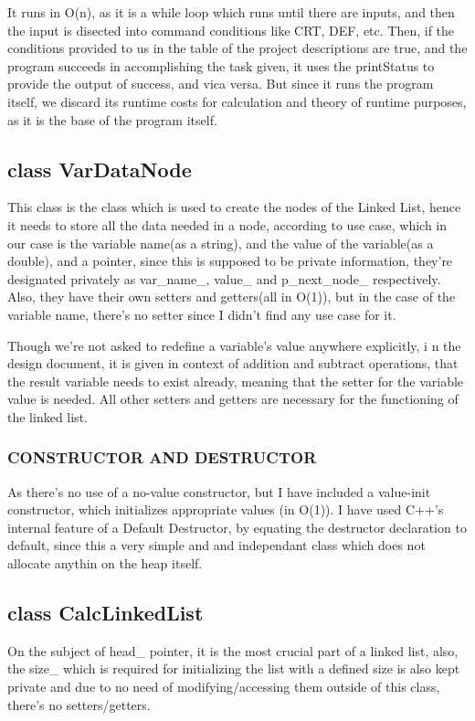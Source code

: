 \documentclass[a4paper]{article}
\begin{document}
    It runs in {\color{lightblue}O(n)}, as it is a while loop which runs until there are 
    inputs, and then the input is disected into command conditions like 
    CRT, DEF, etc. Then, if the conditions provided to us in the table of 
    the project descriptions are true, and the program succeeds in 
    accomplishing the task given, it uses the {\color{draculapurple}printStatus} 
    to provide the output of success, and vica versa. But since it runs the program itself, 
    we discard its runtime costs for calculation and theory of runtime purposes, 
    as it is the base of the program itself.
    \subsection{{\color{orange}class} {\color{draculapurple}VarDataNode}}
    This class is the class which is used to create the nodes of the Linked List, 
    hence it needs to store all the data needed in a node, according to use case, 
    which in our case is the variable name{\color{orange}(as a string)}, and the value of the 
    variable{\color{orange}(as a double)}, and a pointer, since this is supposed to be private information, 
    they're designated privately as var\_name\_, value\_ and p\_next\_node\_ respectively. 
    Also, they have their own setters and getters{\color{lightblue}(all in O(1))}, 
    but in the case of the variable name, there's no setter since I didn't find 
    any use case for it. 
    
    Though we're not asked to redefine a variable's value anywhere explicitly, i
    n the design document, it is given in context of addition and subtract operations, 
    that the result variable needs to exist already, meaning that the setter 
    for the variable value is needed. All other setters and getters are 
    necessary for the functioning of the linked list. 
    \subsubsection{\color{draculapurple}CONSTRUCTOR AND DESTRUCTOR}
    As there's no use of a no-value constructor, but I have included a value-init constructor, 
    which initializes appropriate values {\color{lightblue}(in O(1))}.
    I have used C++'s internal feature of a Default Destructor, 
    by equating the destructor declaration to default, since this a very 
    simple and and independant class which does not allocate anythin on the heap itself. 
    \subsection{{\color{orange}class} {\color{draculapurple}CalcLinkedList}}
    On the subject of {\color{LimeGreen}head\_} pointer, it is the most crucial part of a linked list, 
    also, the {\color{LimeGreen}size\_} which is required for initializing 
    the list with a defined size is also kept private and due to no 
    need of modifying/accessing them outside of this class, there's no setters/getters.
\end{document}
